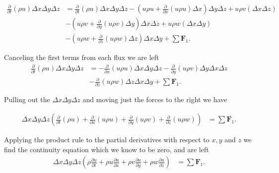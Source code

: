 \documentclass[12pt]{report}
\begin{document}
\begin{align*} \frac{\partial }{\partial t} \left ( \rho u \right) \Delta x \Delta y \Delta z &= \frac{\partial }{\partial t} \left ( \rho u \right) \Delta x \Delta y \Delta z  - \left ( u\rho u + \frac{\partial}{\partial x} \left( u\rho u\right ) \Delta x \right ) \Delta y \Delta z +  u \rho v (\Delta x \Delta z) \\
& - \left ( u\rho v + \frac{\partial}{\partial y} \left( u\rho v\right ) \Delta y \right ) \Delta x \Delta z + u \rho w (\Delta x \Delta y)\\
& - \left ( u\rho w + \frac{\partial}{\partial z} \left( u\rho w\right ) \Delta z \right ) \Delta x \Delta y + \sum \mathbf{F}_1.\end{align*}

Canceling the first terms from each flux we are left
\begin{align*} \frac{\partial }{\partial t} \left ( \rho u \right) \Delta x \Delta y \Delta z &=  -  \frac{\partial}{\partial x} \left( u\rho u\right ) \Delta x  \Delta y \Delta z - \frac{\partial}{\partial y} \left( u\rho v\right ) \Delta y \Delta x \Delta z\\
& - \frac{\partial}{\partial z} \left( u\rho w\right ) \Delta z \Delta x \Delta y + \sum \mathbf{F}_1.\end{align*}

Pulling out the $\Delta x \Delta y \Delta z$ and moving just the forces to the right we have

\begin{align*} \Delta x \Delta y \Delta z \left (\frac{\partial }{\partial t} \left ( \rho u \right)  +  \frac{\partial}{\partial x} \left( u\rho u\right )  + \frac{\partial}{\partial y} \left( u\rho v\right ) +\frac{\partial}{\partial z} \left( u\rho w\right ) \right ) &= \sum \mathbf{F}_1.\end{align*}

Applying the product rule to the partial derivatives with respect to $x,y$ and $z$ we find the continuity equation which we know to be zero, and are left
\begin{align*} \Delta x \Delta y \Delta z \left ( \rho \frac{\partial u }{\partial t} + \rho u \frac{\partial u }{\partial x} + \rho v \frac{\partial u}{\partial y} + \rho w \frac{\partial u}{\partial z} \right ) &= \sum \mathbf{F}_1 .\end{align*}
\end{document}
